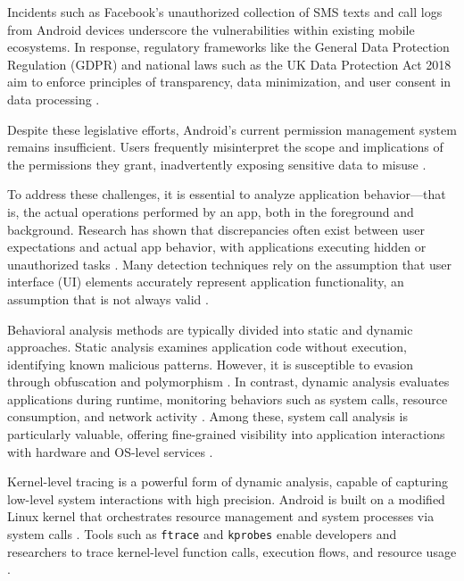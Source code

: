 \documentclass[a4paper,12pt]{report}
\begin{document}
Incidents such as Facebook's unauthorized collection of SMS texts and call logs from Android devices \cite{verge2018facebooksms} underscore the vulnerabilities within existing mobile ecosystems. In response, regulatory frameworks like the General Data Protection Regulation (GDPR) and national laws such as the UK Data Protection Act 2018 aim to enforce principles of transparency, data minimization, and user consent in data processing \cite{gdpr2018, dpa2018}.

Despite these legislative efforts, Android's current permission management system remains insufficient. Users frequently misinterpret the scope and implications of the permissions they grant, inadvertently exposing sensitive data to misuse \cite{feng2020survey, felt2012permissions}.

To address these challenges, it is essential to analyze application behavior—that is, the actual operations performed by an app, both in the foreground and background. Research has shown that discrepancies often exist between user expectations and actual app behavior, with applications executing hidden or unauthorized tasks \cite{uipicker2019, gorla2014checking}. Many detection techniques rely on the assumption that user interface (UI) elements accurately represent application functionality, an assumption that is not always valid \cite{nan2019uipicker}.

Behavioral analysis methods are typically divided into static and dynamic approaches. Static analysis examines application code without execution, identifying known malicious patterns. However, it is susceptible to evasion through obfuscation and polymorphism \cite{arzt2014flowdroid, enck2010taintdroid}. In contrast, dynamic analysis evaluates applications during runtime, monitoring behaviors such as system calls, resource consumption, and network activity \cite{xu2011crowdroid, lindorfer2014andrubis}. Among these, system call analysis is particularly valuable, offering fine-grained visibility into application interactions with hardware and OS-level services \cite{canfora2015syscalls}.

Kernel-level tracing is a powerful form of dynamic analysis, capable of capturing low-level system interactions with high precision. Android is built on a modified Linux kernel that orchestrates resource management and system processes via system calls \cite{love2010linux}. Tools such as \texttt{ftrace} and \texttt{kprobes} enable developers and researchers to trace kernel-level function calls, execution flows, and resource usage \cite{rostedt2023ftrace, kernel2023kprobes}.
\end{document}
